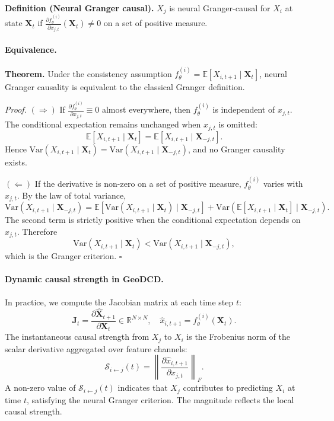 \documentclass{article}
\begin{document}
\noindent\textbf{Definition (Neural Granger causal).}
\(X_j\) is neural Granger-causal for \(X_i\) at state \(\mathbf{X}_t\) if \(\frac{\partial f_\theta^{(i)}}{\partial x_{j,t}}(\mathbf{X}_t) \neq 0\) on a set of positive measure.

\paragraph{Equivalence.}

\noindent\textbf{Theorem.}
Under the consistency assumption \(f_\theta^{(i)} = \mathbb{E}[X_{i,t+1}\mid \mathbf{X}_t]\), neural Granger causality is equivalent to the classical Granger definition.

\noindent\textit{Proof.}
\((\Rightarrow)\) If \(\frac{\partial f_\theta^{(i)}}{\partial x_{j,t}} \equiv 0\) almost everywhere, then \(f_\theta^{(i)}\) is independent of \(x_{j,t}\). The conditional expectation remains unchanged when \(x_{j,t}\) is omitted:
\[
\mathbb{E}[X_{i,t+1}\mid \mathbf{X}_t] = \mathbb{E}[X_{i,t+1}\mid \mathbf{X}_{-j,t}].
\]
Hence \(\mathrm{Var}(X_{i,t+1}\mid \mathbf{X}_t) = \mathrm{Var}(X_{i,t+1}\mid \mathbf{X}_{-j,t})\), and no Granger causality exists.

\((\Leftarrow)\) If the derivative is non-zero on a set of positive measure, \(f_\theta^{(i)}\) varies with \(x_{j,t}\). By the law of total variance,
\[
\mathrm{Var}(X_{i,t+1}\mid \mathbf{X}_{-j,t}) = \mathbb{E}\left[\mathrm{Var}(X_{i,t+1}\mid \mathbf{X}_t) \mid \mathbf{X}_{-j,t}\right] + \mathrm{Var}\left(\mathbb{E}[X_{i,t+1}\mid \mathbf{X}_t] \mid \mathbf{X}_{-j,t}\right).
\]
The second term is strictly positive when the conditional expectation depends on \(x_{j,t}\). Therefore
\[
\mathrm{Var}(X_{i,t+1}\mid \mathbf{X}_t) < \mathrm{Var}(X_{i,t+1}\mid \mathbf{X}_{-j,t}),
\]
which is the Granger criterion. \(\square\)

\paragraph{Dynamic causal strength in GeoDCD.}
In practice, we compute the Jacobian matrix at each time step \(t\):
\[
\mathbf{J}_t = \frac{\partial \hat{\mathbf{X}}_{t+1}}{\partial \mathbf{X}_t} \in \mathbb{R}^{N \times N}, \quad \hat{x}_{i,t+1} = f_\theta^{(i)}(\mathbf{X}_t).
\]
The instantaneous causal strength from \(X_j\) to \(X_i\) is the Frobenius norm of the scalar derivative aggregated over feature channels:
\[
\mathcal{S}_{i \leftarrow j}(t) = \left\| \frac{\partial \hat{x}_{i,t+1}}{\partial x_{j,t}} \right\|_F.
\]
A non-zero value of \(\mathcal{S}_{i \leftarrow j}(t)\) indicates that \(X_j\) contributes to predicting \(X_i\) at time \(t\), satisfying the neural Granger criterion. The magnitude reflects the local causal strength.
\end{document}
